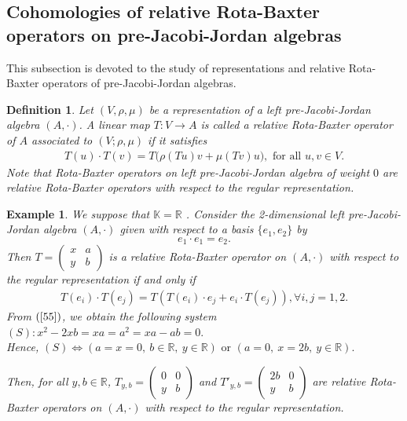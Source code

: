 \documentclass[12pt]{amsart}
\newtheorem{definition}[Theorem]{Definition}
\newtheorem{example}[Theorem]{Example}
\begin{document}
	\subsection{Cohomologies of relative Rota-Baxter operators on pre-Jacobi-Jordan algebras}
	This subsection is devoted to the study of representations and 
	relative Rota-Baxter operators of pre-Jacobi-Jordan algebras.
\begin{definition}\label{D8}
	Let $ (V, \rho,\mu) $ be a representation of a left pre-Jacobi-Jordan algebra $ (A,\cdot) $. A linear map $ T : V\to A $ is called a relative Rota-Baxter operator  of $ A $ associated to $ (V; \rho,\mu) $ if it satisfies
	\begin{eqnarray}
		\label{14}
		T(u)\cdot T(v)=T\biggl(\rho(Tu)v+\mu(Tv)u \biggr),  \text{ for all } u,v\in V.
	\end{eqnarray}
	Note that Rota-Baxter operators on left pre-Jacobi-Jordan algebra of weight $ 0 $ are  relative Rota-Baxter operators  with respect to the regular representation.
\end{definition}	
\begin{example}
	We suppose that $ \mathbb{K}=\mathbb{R} $ . Consider the 2-dimensional left pre-Jacobi-Jordan algebra $ (A,\cdot) $ given with respect to a basis $ \{e_{1},e_{2}\} $ by $$ e_{1}\cdot e_{1}=e_{2}.$$
	Then $T=\begin{pmatrix} x&a\\ y&b \end{pmatrix}  $ is a relative Rota-Baxter operator on $ (A,\cdot) $  with respect to the regular representation if and only if  
	\begin{eqnarray}
		\label{55}
		T(e_{i})\cdot T(e_{j})=T\left(T(e_{i})\cdot e_{j}+e_{i}\cdot T(e_{j}) \right),\forall i,j=1,2.
	\end{eqnarray}
	From $ (\ref{55}) $, we obtain the following system $(S): 
		x^{2}-2xb=
		xa=
		a^{2}=
		xa-ab=0.$ \\
		
Hence, 	$ (S) \iff 
		(a=
		x=0,\ 
		b\in \mathbb{R},\ 
		y\in \mathbb{R})
	\text{ or }
		( a=0,\ 
		x=2b,\ 
		y\in \mathbb{R}).
	$
	
	
	
	Then, for all $ y,b\in\mathbb{R} $, $T_{y,b}=\begin{pmatrix} 0&0\\ y&b \end{pmatrix}  $ and $T'_{y,b}=\begin{pmatrix} 2b&0\\ y&b \end{pmatrix}  $ are relative Rota-Baxter operators on $ (A,\cdot) $  with respect to the regular representation.  
\end{example}
\end{document}
